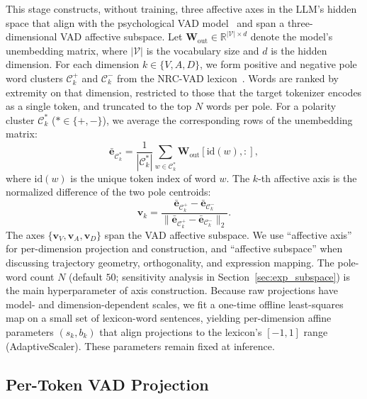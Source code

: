 \documentclass[letterpaper, 10 pt, conference]{ieeeconf/ieeeconf}
\begin{document}
This stage constructs, without training, three affective axes in the LLM's hidden space that align with the psychological VAD model~\cite{russell1977evidence} and span a three-dimensional VAD affective subspace.
Let $\mathbf{W}_{\mathrm{out}} \in \mathbb{R}^{|\mathcal{V}| \times d}$ denote the model's unembedding matrix, where $|\mathcal{V}|$ is the vocabulary size and $d$ is the hidden dimension.
For each dimension $k \in \{V, A, D\}$, we form positive and negative pole word clusters $\mathcal{C}^{+}_k$ and $\mathcal{C}^{-}_k$ from the NRC-VAD lexicon~\cite{mohammad2018nrcvad}. Words are ranked by extremity on that dimension, restricted to those that the target tokenizer encodes as a single token, and truncated to the top $N$ words per pole.
For a polarity cluster $\mathcal{C}^{*}_k$ ($* \in \{+, -\}$), we average the corresponding rows of the unembedding matrix:
\begin{equation}
    \bar{\mathbf{e}}_{\mathcal{C}^{*}_k} = \frac{1}{|\mathcal{C}^{*}_k|}\sum_{w \in \mathcal{C}^{*}_k} \mathbf{W}_{\mathrm{out}}[\mathrm{id}(w), :],
\end{equation}
where $\mathrm{id}(w)$ is the unique token index of word $w$.
The $k$-th affective axis is the normalized difference of the two pole centroids:
\begin{equation}
    \mathbf{v}_k = \frac{\bar{\mathbf{e}}_{\mathcal{C}^{+}_k} - \bar{\mathbf{e}}_{\mathcal{C}^{-}_k}}{\bigl\|\bar{\mathbf{e}}_{\mathcal{C}^{+}_k} - \bar{\mathbf{e}}_{\mathcal{C}^{-}_k}\bigr\|_2}.
    \label{eq:valence_axis}
\end{equation}
The axes $\{\mathbf{v}_V, \mathbf{v}_A, \mathbf{v}_D\}$ span the VAD affective subspace. We use ``affective axis'' for per-dimension projection and construction, and ``affective subspace'' when discussing trajectory geometry, orthogonality, and expression mapping.
The pole-word count $N$ (default $50$; sensitivity analysis in Section~\ref{sec:exp_subspace}) is the main hyperparameter of axis construction.
Because raw projections have model- and dimension-dependent scales, we fit a one-time offline least-squares map on a small set of lexicon-word sentences, yielding per-dimension affine parameters $(s_k, b_k)$ that align projections to the lexicon's $[-1, 1]$ range (AdaptiveScaler). These parameters remain fixed at inference.

\subsection{Per-Token VAD Projection}
\label{sec:projection}
\end{document}
